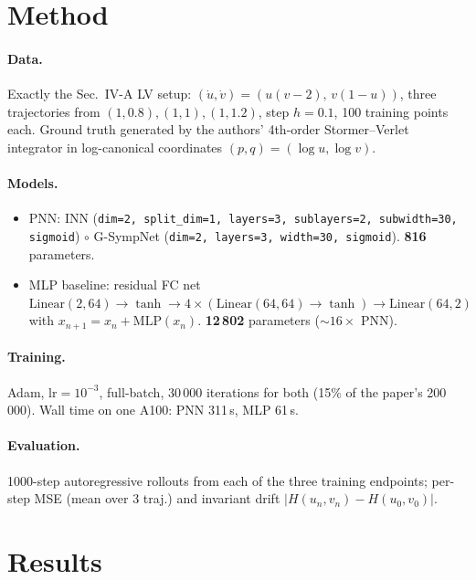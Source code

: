 \documentclass[11pt]{article}
\begin{document}
\section{Method}
\paragraph{Data.} Exactly the Sec.~IV-A LV setup:
$(\dot u,\dot v) = (u(v-2),\, v(1-u))$, three trajectories from
$(1,0.8), (1,1), (1,1.2)$, step $h=0.1$, 100 training points each.
Ground truth generated by the authors' 4th-order Stormer--Verlet integrator in
log-canonical coordinates $(p,q) = (\log u, \log v)$.

\paragraph{Models.}
\begin{itemize}
\item PNN: INN (\texttt{dim=2, split\_dim=1, layers=3, sublayers=2, subwidth=30,
      sigmoid}) $\circ$ G-SympNet (\texttt{dim=2, layers=3, width=30, sigmoid}).
      \textbf{816} parameters.
\item MLP baseline: residual FC net $\mathrm{Linear}(2,64)\!\to\!\tanh\!\to\!
      4\!\times\!(\mathrm{Linear}(64,64)\!\to\!\tanh)\!\to\!\mathrm{Linear}(64,2)$
      with $x_{n+1} = x_n + \mathrm{MLP}(x_n)$. \textbf{12\,802} parameters
      ($\sim 16\times$ PNN).
\end{itemize}

\paragraph{Training.} Adam, $\mathrm{lr}=10^{-3}$, full-batch, 30\,000
iterations for both (15\% of the paper's 200\,000). Wall time on one A100:
PNN 311\,s, MLP 61\,s.

\paragraph{Evaluation.} 1000-step autoregressive rollouts from each of the
three training endpoints; per-step MSE (mean over 3 traj.) and invariant drift
$|H(u_n,v_n)-H(u_0,v_0)|$.

\section{Results}
\end{document}
